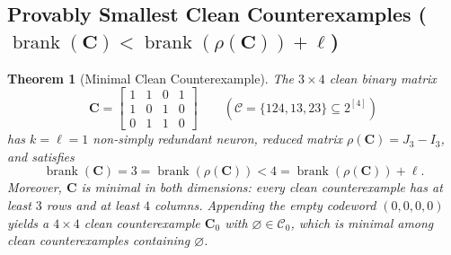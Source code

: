 \documentclass[11pt]{article}
\theoremstyle{plain}
\newtheorem{theorem}{Theorem}[section]
\theoremstyle{definition}
\theoremstyle{remark}
\DeclareMathOperator{\brank}{brank}
\begin{document}
\subsection{Provably Smallest Clean Counterexamples ($\brank(\mathbf{C}) < \brank(\rho(\mathbf{C})) + \ell$)}

\begin{theorem}[Minimal Clean Counterexample]\label{thm:minclean}
The $3 \times 4$ clean binary matrix
\[
\mathbf{C} = \begin{bmatrix} 1 & 1 & 0 & 1 \\ 1 & 0 & 1 & 0 \\ 0 & 1 & 1 & 0 \end{bmatrix} \qquad (\mathcal{C} = \{124, 13, 23\} \subseteq 2^{[4]})
\]
has $k = \ell = 1$ non-simply redundant neuron, reduced matrix $\rho(\mathbf{C}) = J_3 - I_3$, and satisfies
\[
\brank(\mathbf{C}) = 3 = \brank(\rho(\mathbf{C})) < 4 = \brank(\rho(\mathbf{C})) + \ell.
\]
Moreover, $\mathbf{C}$ is minimal in both dimensions: every clean counterexample has at least $3$ rows and at least $4$ columns. Appending the empty codeword $(0,0,0,0)$ yields a $4 \times 4$ clean counterexample $\mathbf{C}_0$ with $\varnothing \in \mathcal{C}_0$, which is minimal among clean counterexamples containing $\varnothing$.
\end{theorem}
\end{document}
